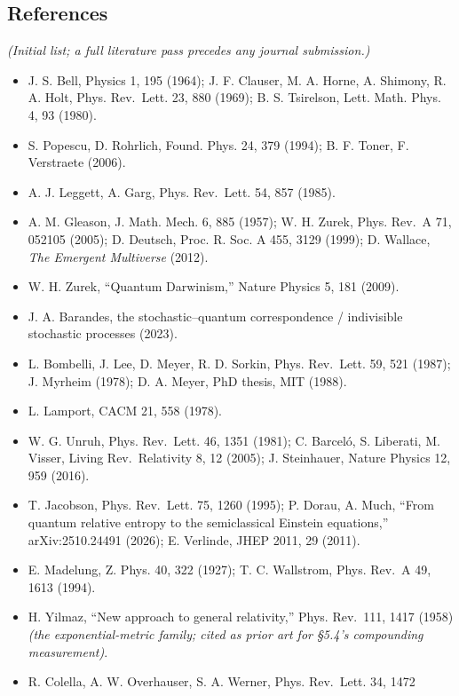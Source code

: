 \documentclass[
  11pt,
]{article}
\providecommand{\tightlist}{%
  \setlength{\itemsep}{0pt}\setlength{\parskip}{0pt}}
\begin{document}
\subsection{References}\label{references}

\emph{(Initial list; a full literature pass precedes any journal
submission.)}

\begin{itemize}
\tightlist
\item
  J. S. Bell, Physics 1, 195 (1964); J. F. Clauser, M. A. Horne, A.
  Shimony, R. A. Holt, Phys. Rev.~Lett. 23, 880 (1969); B. S. Tsirelson,
  Lett. Math. Phys. 4, 93 (1980).
\item
  S. Popescu, D. Rohrlich, Found. Phys. 24, 379 (1994); B. F. Toner, F.
  Verstraete (2006).
\item
  A. J. Leggett, A. Garg, Phys. Rev.~Lett. 54, 857 (1985).
\item
  A. M. Gleason, J. Math. Mech. 6, 885 (1957); W. H. Zurek, Phys. Rev.~A
  71, 052105 (2005); D. Deutsch, Proc. R. Soc. A 455, 3129 (1999); D.
  Wallace, \emph{The Emergent Multiverse} (2012).
\item
  W. H. Zurek, ``Quantum Darwinism,'' Nature Physics 5, 181 (2009).
\item
  J. A. Barandes, the stochastic--quantum correspondence / indivisible
  stochastic processes (2023).
\item
  L. Bombelli, J. Lee, D. Meyer, R. D. Sorkin, Phys. Rev.~Lett. 59, 521
  (1987); J. Myrheim (1978); D. A. Meyer, PhD thesis, MIT (1988).
\item
  L. Lamport, CACM 21, 558 (1978).
\item
  W. G. Unruh, Phys. Rev.~Lett. 46, 1351 (1981); C. Barceló, S.
  Liberati, M. Visser, Living Rev.~Relativity 8, 12 (2005); J.
  Steinhauer, Nature Physics 12, 959 (2016).
\item
  T. Jacobson, Phys. Rev.~Lett. 75, 1260 (1995); P. Dorau, A. Much,
  ``From quantum relative entropy to the semiclassical Einstein
  equations,'' arXiv:2510.24491 (2026); E. Verlinde, JHEP 2011, 29
  (2011).
\item
  E. Madelung, Z. Phys. 40, 322 (1927); T. C. Wallstrom, Phys. Rev.~A
  49, 1613 (1994).
\item
  H. Yilmaz, ``New approach to general relativity,'' Phys. Rev.~111,
  1417 (1958) \emph{(the exponential-metric family; cited as prior art
  for \S{}5.4's compounding measurement)}.
\item
  R. Colella, A. W. Overhauser, S. A. Werner, Phys. Rev.~Lett. 34, 1472

\end{itemize}
\end{document}
